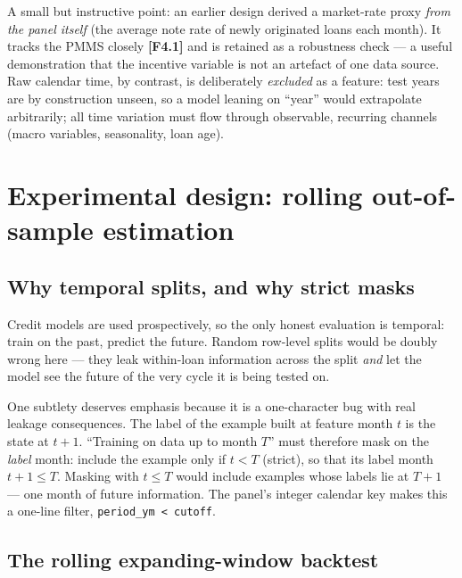 \documentclass[11pt,a4paper]{article}
\newcommand{\code}[1]{\texttt{#1}}
\newcommand{\artifact}[1]{\textbf{[#1]}}
\begin{document}
A small but instructive point: an earlier design derived a market-rate proxy \emph{from the panel itself} (the average note rate of newly originated loans each month). It tracks the PMMS closely \artifact{F4.1} and is retained as a robustness check --- a useful demonstration that the incentive variable is not an artefact of one data source. Raw calendar time, by contrast, is deliberately \emph{excluded} as a feature: test years are by construction unseen, so a model leaning on ``year'' would extrapolate arbitrarily; all time variation must flow through observable, recurring channels (macro variables, seasonality, loan age).

\section{Experimental design: rolling out-of-sample estimation}\label{sec:design}

\subsection{Why temporal splits, and why strict masks}

Credit models are used prospectively, so the only honest evaluation is temporal: train on the past, predict the future. Random row-level splits would be doubly wrong here --- they leak within-loan information across the split \emph{and} let the model see the future of the very cycle it is being tested on.

One subtlety deserves emphasis because it is a one-character bug with real leakage consequences. The label of the example built at feature month $t$ is the state at $t{+}1$. ``Training on data up to month $T$'' must therefore mask on the \emph{label} month: include the example only if $t < T$ (strict), so that its label month $t{+}1 \le T$. Masking with $t\le T$ would include examples whose labels lie at $T{+}1$ --- one month of future information. The panel's integer calendar key makes this a one-line filter, \code{period\_ym < cutoff}.

\subsection{The rolling expanding-window backtest}
\end{document}
